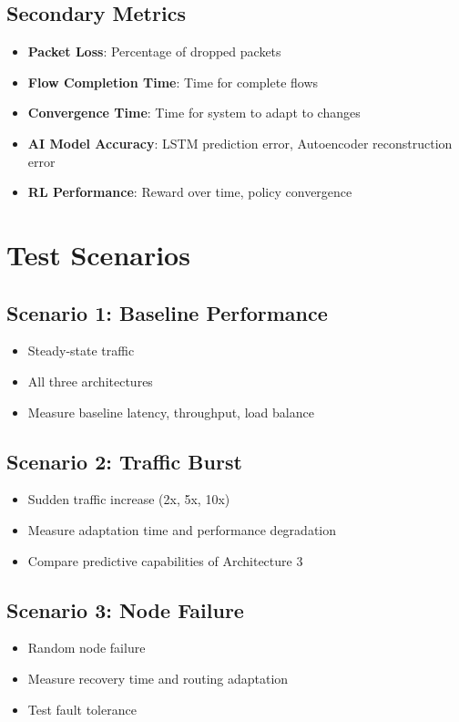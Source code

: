 \documentclass[11pt,a4paper]{article}
\begin{document}
\subsection{Secondary Metrics}
\begin{itemize}
    \item \textbf{Packet Loss}: Percentage of dropped packets
    \item \textbf{Flow Completion Time}: Time for complete flows
    \item \textbf{Convergence Time}: Time for system to adapt to changes
    \item \textbf{AI Model Accuracy}: LSTM prediction error, Autoencoder reconstruction error
    \item \textbf{RL Performance}: Reward over time, policy convergence
\end{itemize}

\section{Test Scenarios}

\subsection{Scenario 1: Baseline Performance}
\begin{itemize}
    \item Steady-state traffic
    \item All three architectures
    \item Measure baseline latency, throughput, load balance
\end{itemize}

\subsection{Scenario 2: Traffic Burst}
\begin{itemize}
    \item Sudden traffic increase (2x, 5x, 10x)
    \item Measure adaptation time and performance degradation
    \item Compare predictive capabilities of Architecture 3
\end{itemize}

\subsection{Scenario 3: Node Failure}
\begin{itemize}
    \item Random node failure
    \item Measure recovery time and routing adaptation
    \item Test fault tolerance
\end{itemize}
\end{document}
